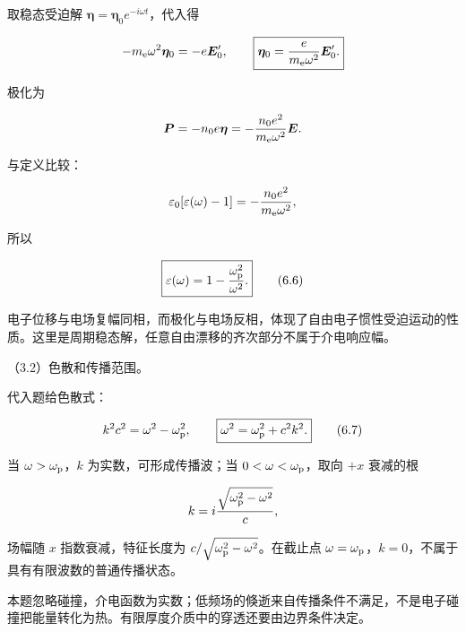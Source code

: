 \documentclass[12pt,a4paper,fontset=fandol]{ctexart}
\begin{document}
取稳态受迫解 \(\boldsymbol\eta=\boldsymbol\eta_0e^{-i\omega t}\)，代入得

\[
-m_{\rm e}\omega^2\boldsymbol\eta_0=-e\boldsymbol E_0',
\qquad
\boxed{\boldsymbol\eta_0=\frac{e}{m_{\rm e}\omega^2}\boldsymbol E_0'.}
\]

极化为

\[
\boldsymbol P=-n_0e\boldsymbol\eta
=-\frac{n_0e^2}{m_{\rm e}\omega^2}\boldsymbol E.
\]

与定义比较：

\[
\varepsilon_0[\varepsilon(\omega)-1]
=-\frac{n_0e^2}{m_{\rm e}\omega^2},
\]

所以

\[
\boxed{\varepsilon(\omega)=1-\frac{\omega_{\rm p}^2}{\omega^2}.}
\tag{6.6}
\]

电子位移与电场复幅同相，而极化与电场反相，体现了自由电子惯性受迫运动的性质。这里是周期稳态解，任意自由漂移的齐次部分不属于介电响应幅。

（3.2）色散和传播范围。

代入题给色散式：

\[
k^2c^2=\omega^2-\omega_{\rm p}^2,
\qquad
\boxed{\omega^2=\omega_{\rm p}^2+c^2k^2.}
\tag{6.7}
\]

当 \(\omega>\omega_{\rm p}\)，\(k\) 为实数，可形成传播波；当
\(0<\omega<\omega_{\rm p}\)，取向 \(+x\) 衰减的根

\[
k=i\frac{\sqrt{\omega_{\rm p}^2-\omega^2}}c,
\]

场幅随 \(x\) 指数衰减，特征长度为
\(c/\sqrt{\omega_{\rm p}^2-\omega^2}\)。在截止点
\(\omega=\omega_{\rm p}\)，\(k=0\)，不属于具有有限波数的普通传播状态。

本题忽略碰撞，介电函数为实数；低频场的倏逝来自传播条件不满足，不是电子碰撞把能量转化为热。有限厚度介质中的穿透还要由边界条件决定。

\begin{center}
\begin{minipage}{\linewidth}
\centering\begingroup
{}
\ifdim\wd\diagrambox>.88\linewidth
\sbox{\diagrambox}{\resizebox{.88\linewidth}{!}{\usebox{\diagrambox}}}
\fi
\ifdim\ht\diagrambox>.29\textheight
\resizebox{!}{.29\textheight}{\usebox{\diagrambox}}
\else\usebox{\diagrambox}\fi
\par{}
\endgroup\end{minipage}
\end{center}
\end{document}
